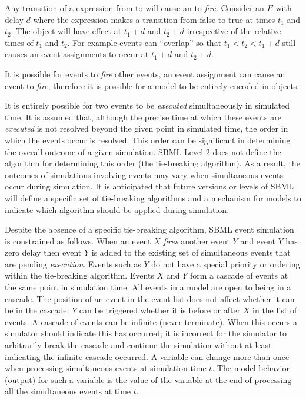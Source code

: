 Any transition of a  expression from  to
 will cause an  to \emph{fire}.  Consider
an  $E$ with delay $d$ where the 
expression makes a transition from false to true at times $t_1$
and $t_2$.  The \EventAssignment object will have effect at
$t_1+d$ and $t_2+d$ irrespective of the relative times of $t_1$
and $t_2$. For example events can ``overlap'' so that $t_1 < t_2 <
t_1+d$ still causes an event assignments to occur at $t_1+d$ and
$t_2+d$.

It is possible for events to \emph{fire} other events, \ie an
event assignment can cause an event to \emph{fire}, therefore it
is possible for a model to be entirely encoded in \Event
objects.

It is entirely possible for two events to be \emph{executed}
simultaneously in simulated time.  It is assumed that, although
the precise time at which these events are \emph{executed} is not
resolved beyond the given point in simulated time, the order in
which the events occur is resolved.  This order can be significant
in determining the overall outcome of a given simulation. SBML
Level 2 does not define the algorithm for determining this order
(the tie-breaking algorithm).  As a result, the outcomes of
simulations involving events may vary when simultaneous events
occur during simulation.  It is anticipated that future versions
or levels of SBML will define a specific set of tie-breaking
algorithms and a mechanism for models to indicate which algorithm
should be applied during simulation.

Despite the absence of a specific tie-breaking algorithm, SBML
event simulation is constrained as follows. When an event $X$
\emph{fires} another event $Y$ and event $Y$ has zero delay then
event $Y$ is added to the existing set of simultaneous events that
are pending \emph{execution}.  Events such as $Y$ do not have a
special priority or ordering within the tie-breaking algorithm.
Events $X$ and $Y$ form a cascade of events at the same point in
simulation time.  All events in a model are open to being in a
cascade.  The position of an event in the event list does not
affect whether it can be in the cascade: $Y$ can be triggered
whether it is before or after $X$ in the list of events.  A
cascade of events can be infinite (never terminate).  When this
occurs a simulator should indicate this has occurred; \ie it is
incorrect for the simulator to arbitrarily break the cascade and
continue the simulation without at least indicating the infinite
cascade occurred. A variable can change more than once when
processing simultaneous events at simulation time $t$.  The model
behavior (output) for such a variable is the value of the variable
at the end of processing all the simultaneous events at time $t$.











